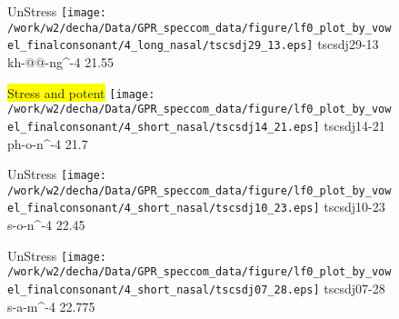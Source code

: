 \documentclass{article}
\begin{document}
\begin{figure}[t]
\begin{minipage}[b]{.24\textwidth}
UnStress
\centering
\texttt{[image: /work/w2/decha/Data/GPR\_speccom\_data/figure/lf0\_plot\_by\_vowel\_finalconsonant/4\_long\_nasal/tscsdj29\_13.eps]}
tscsdj29-13 kh-@@-ng\textasciicircum-4 21.55
\end{minipage}
\begin{minipage}[b]{.24\textwidth}
\colorbox{yellow}{Stress and potent}
\centering
\texttt{[image: /work/w2/decha/Data/GPR\_speccom\_data/figure/lf0\_plot\_by\_vowel\_finalconsonant/4\_short\_nasal/tscsdj14\_21.eps]}
tscsdj14-21 ph-o-n\textasciicircum-4 21.7
\end{minipage}
\begin{minipage}[b]{.24\textwidth}
UnStress
\centering
\texttt{[image: /work/w2/decha/Data/GPR\_speccom\_data/figure/lf0\_plot\_by\_vowel\_finalconsonant/4\_short\_nasal/tscsdj10\_23.eps]}
tscsdj10-23 s-o-n\textasciicircum-4 22.45
\end{minipage}
\begin{minipage}[b]{.24\textwidth}
UnStress
\centering
\texttt{[image: /work/w2/decha/Data/GPR\_speccom\_data/figure/lf0\_plot\_by\_vowel\_finalconsonant/4\_short\_nasal/tscsdj07\_28.eps]}
tscsdj07-28 s-a-m\textasciicircum-4 22.775
\end{minipage}
\end{figure}
\end{document}
